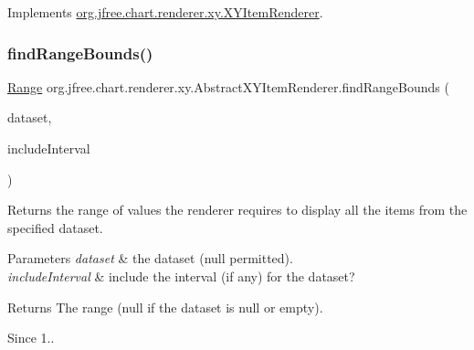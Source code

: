 Implements \mbox{\hyperlink{interfaceorg_1_1jfree_1_1chart_1_1renderer_1_1xy_1_1_x_y_item_renderer_af9ac6f440e99c73d343de7851e89496a}{org.\+jfree.\+chart.\+renderer.\+xy.\+X\+Y\+Item\+Renderer}}.

\mbox{\label{classorg_1_1jfree_1_1chart_1_1renderer_1_1xy_1_1_abstract_x_y_item_renderer_afbec9a3d7cef1554317e2cebf6c9802d}} 
\subsubsection{\texorpdfstring{find\+Range\+Bounds()}{findRangeBounds()}\hspace{0.1cm}{\footnotesize\ttfamily [2/2]}}
{\footnotesize\ttfamily \mbox{\hyperlink{classorg_1_1jfree_1_1data_1_1_range}{Range}} org.\+jfree.\+chart.\+renderer.\+xy.\+Abstract\+X\+Y\+Item\+Renderer.\+find\+Range\+Bounds (\begin{DoxyParamCaption}\item[{\mbox{\hyperlink{interfaceorg_1_1jfree_1_1data_1_1xy_1_1_x_y_dataset}{X\+Y\+Dataset}}}]{dataset,  }\item[{boolean}]{include\+Interval }\end{DoxyParamCaption})\hspace{0.3cm}{\ttfamily [protected]}}

Returns the range of values the renderer requires to display all the items from the specified dataset.


\begin{DoxyParams}{Parameters}
{\em dataset} & the dataset ({\ttfamily null} permitted). \\
\hline
{\em include\+Interval} & include the interval (if any) for the dataset?\\
\hline
\end{DoxyParams}
\begin{DoxyReturn}{Returns}
The range ({\ttfamily null} if the dataset is {\ttfamily null} or empty).
\end{DoxyReturn}
\begin{DoxySince}{Since}
1.. 
\end{DoxySince}
\mbox{\label{classorg_1_1jfree_1_1chart_1_1renderer_1_1xy_1_1_abstract_x_y_item_renderer_ad36b4883565657010d15fbb49f5ea9a7}} 
